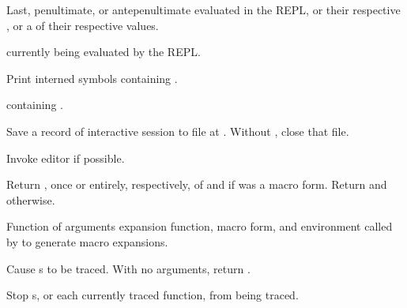 \begin{LIST}{1cm}
  
  {
  Last, penultimate, or antepenultimate  evaluated in the REPL, or
  their respective , or a  of their respective
  values. 
  }

  \IT{\V*{--}}
  {
   currently being evaluated by the REPL.
  }

  {
  Print interned symbols containing .
  }

  {
   containing .
  }

  {
  Save a record of interactive session to file at . Without
  , close that file.
  }

  {
  Invoke editor if possible.
  }

  {
  Return , once or entirely, respectively, of
   and \retvalii{\T} if  was a macro form. 
  Return  and \retvalii{\NIL} otherwise.
  }

  {
  Function of arguments expansion function, macro form, and
  environment called by  to generate macro
  expansions. 
  }

  {
  Cause s to be traced. With no arguments,
  return .
  }

  {
  Stop s, or each currently traced function, from being
  traced. 
  }


\end{LIST}
